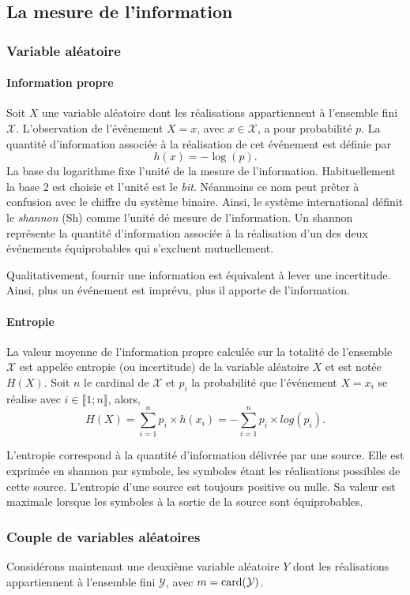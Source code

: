 \subsection{La mesure de l'information}
\subsubsection{Variable aléatoire}
\paragraph*{Information propre}
Soit $X$ une variable aléatoire dont les réalisations appartiennent à l'ensemble fini $\mathcal{X}$. L'observation de 
l'événement $X=x$, avec $x\in \mathcal{X}$, a pour probabilité $p$. La quantité d'information associée à la réalisation
de cet événement est définie par \[h(x)=-\log(p).\]
La base du logarithme fixe l'unité de la mesure de l'information. Habituellement la base 2 est
choisie et l'unité est le \emph{bit}. Néanmoins ce nom peut prêter à confusion avec le chiffre du système binaire. 
Ainsi, le système international \cite{ISO} définit le \emph{shannon} (Sh) comme l'unité dé mesure de l'information. Un shannon 
représente la quantité d’information associée à la réalisation d'un des deux événements équiprobables qui s’excluent 
mutuellement. 

Qualitativement, fournir une information est équivalent à lever une incertitude. Ainsi, plus un événement est imprévu, 
plus il apporte de l'information.

\paragraph*{Entropie}
La valeur moyenne de l'information propre calculée sur la totalité de l'ensemble $\mathcal{X}$ est appelée entropie (ou 
incertitude) de la variable aléatoire $X$ et est notée $H(X)$. Soit $n$ le cardinal de $\mathcal{X}$ et $p_i$ la 
probabilité que l'événement $X=x_i$ se réalise avec $i\in \llbracket 1; n\rrbracket$, alors, 
\[H(X) = \sum\limits_{i=1}^n p_i\times h(x_i) = - \sum\limits_{i=1}^n p_i\times log(p_i).\]

L'entropie correspond à la quantité d'information délivrée par une source. Elle est exprimée en shannon 
par symbole, les symboles étant les réalisations possibles de cette source. L'entropie d'une source est toujours positive
ou nulle. Sa valeur est maximale lorsque les symboles à la sortie de la source sont équiprobables.

\subsubsection{Couple de variables aléatoires}
Considérons maintenant une deuxième variable aléatoire $Y$ dont les réalisations appartiennent à l'ensemble fini $\mathcal{Y}$, avec 
$m=\operatorname{card}(\mathcal{Y})$.
